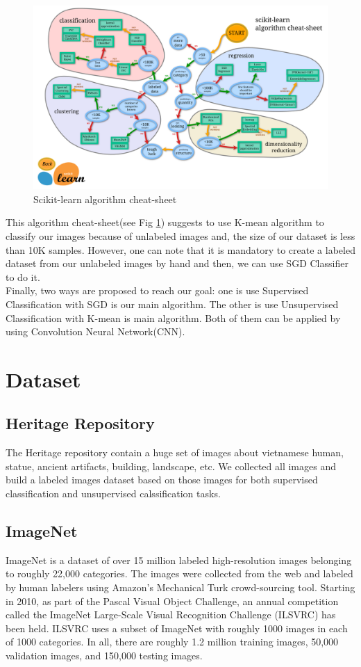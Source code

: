 \documentclass[hidelinks,12pt,a4paper]{report}
\begin{document}
\begin{figure}[ht]
	\includegraphics[width=\textwidth, center]{images/scikit-learn}
	\caption{Scikit-learn algorithm cheat-sheet}
	\label{fig:Scikit-learn}
\end{figure}
This algorithm cheat-sheet(see Fig \ref{fig:Scikit-learn}) suggests to use K-mean algorithm to classify our images because of unlabeled images and, the size of our dataset is less than 10K samples. However, one can note that it is mandatory to create a labeled dataset from our unlabeled images by hand and then, we can use SGD Classifier to do it.
\\
Finally, two ways are proposed to reach our goal: one is use Supervised Classification with SGD is our main algorithm. The other is use Unsupervised Classification with K-mean is main algorithm. Both of them can be applied by using Convolution Neural Network(CNN).\newpage

\section{Dataset}
\subsection{Heritage Repository}
\label{chap:dataset}
The Heritage repository contain a huge set of images about vietnamese human, statue, ancient artifacts, building, landscape, etc. We collected all images and build a labeled images dataset based on those images for both supervised classification and unsupervised calssification tasks.

\subsection{ImageNet}
ImageNet is a dataset of over 15 million labeled high-resolution images belonging to roughly 22,000 categories. The images were collected from the web and labeled by human labelers using Amazon’s Mechanical Turk crowd-sourcing tool. Starting in 2010, as part of the Pascal Visual Object Challenge, an annual competition called the ImageNet Large-Scale Visual Recognition Challenge (ILSVRC) has been held. ILSVRC uses a subset of ImageNet with roughly 1000 images in each of 1000 categories. In all, there are roughly 1.2 million training images, 50,000 validation images, and 150,000 testing images.\\
\end{document}
